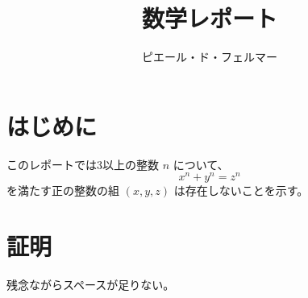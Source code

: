 \documentclass{jlreq}
\begin{document}
\title{数学レポート}
\author{ピエール・ド・フェルマー}
\maketitle

\section{はじめに}

このレポートでは3以上の整数 $n$ について、
\[ x^n + y^n = z^n \]
を満たす正の整数の組 $(x, y, z)$ は存在しないことを示す。
\section{証明}

残念ながらスペースが足りない。
\end{document}
